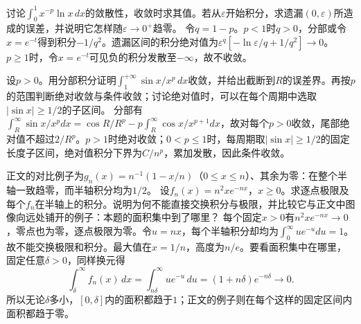 讨论\(\int_0^1x^{-p}\ln x\,dx\)的敛散性，收敛时求其值。若从\(\varepsilon\)开始积分，求遗漏\((0,\varepsilon)\)所造成的误差，并说明它怎样随\(\varepsilon\to0^+\)趋零。
\solutionanswer
令\(q=1-p\)。\(p<1\)时\(q>0\)，分部或令\(x=e^{-t}\)得到积分\(-1/q^2\)。遗漏区间的积分绝对值为\(\varepsilon^q[-\ln\varepsilon/q+1/q^2]\to0\)。\(p\ge1\)时，令\(x=e^{-t}\)可见负的积分发散至\(-\infty\)，故不收敛。


设\(p>0\)。用分部积分证明\(\int_1^{+\infty}\sin x/x^p\,dx\)收敛，并给出截断到\(R\)的误差界。再按\(p\)的范围判断绝对收敛与条件收敛；讨论绝对值时，可以在每个周期中选取\(|\sin x|\ge1/2\)的子区间。
\solutionanswer
分部有\(\int_R^\infty\sin x/x^pdx=\cos R/R^p-p\int_R^\infty\cos x/x^{p+1}dx\)，故对每个\(p>0\)收敛，尾部绝对值不超过\(2/R^p\)。\(p>1\)时绝对收敛；\(0<p\le1\)时，每周期取\(|\sin x|\ge1/2\)的固定长度子区间，绝对值积分下界为\(C/n^p\)，累加发散，因此条件收敛。


正文的对比例子为\(g_n(x)=n^{-1}(1-x/n)\)（\(0\le x\le n\)）、其余为零：在整个半轴一致趋零，而半轴积分均为\(1/2\)。
设\(f_n(x)=n^2xe^{-nx}\)，\(x\ge0\)。求逐点极限及每个\(f_n\)在半轴上的积分。说明为何不能直接交换积分与极限，并比较它与正文中图像向远处铺开的例子：本题的面积集中到了哪里？
\solutionanswer
每个固定\(x>0\)有\(n^2xe^{-nx}\to0\)，零点也为零，逐点极限为零。令\(u=nx\)，每个半轴积分却均为\(\int_0^\infty ue^{-u}du=1\)。故不能交换极限和积分。最大值在\(x=1/n\)，高度为\(n/e\)。要看面积集中在哪里，固定任意\(\delta>0\)，同样换元得
\[
 \int_\delta^\infty f_n(x)\,dx=\int_{n\delta}^\infty ue^{-u}\,du=(1+n\delta)e^{-n\delta}\longrightarrow0.
\]
所以无论\(\delta\)多小，\([0,\delta]\)内的面积都趋于\(1\)；正文的例子则在每个这样的固定区间内面积都趋于零。
\par
